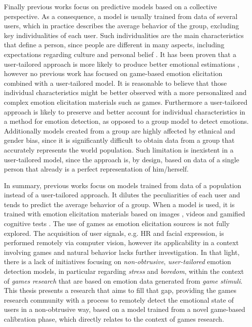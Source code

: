Finally previous works focus on predictive models based on a collective perspective. As a consequence, a model is usually trained from data of several users, which in practice describes the average behavior of the group, excluding key individualities of each user. Such individualities are the main characteristics that define a person, since people are different in many aspects, including expectations regarding culture and personal belief \parencite{goldberg1993structure}. It has been proven that a user-tailored approach is more likely to produce better emotional estimations \parencite{bailenson2008real}, however no previous work has focused on game-based emotion elicitation combined with a user-tailored model. It is reasonable to believe that those individual characteristics might be better observed with a more personalized and complex emotion elicitation materials such as games. Furthermore a user-tailored approach is likely to preserve and better account for individual characteristics in a method for emotion detection, as opposed to a group model to detect emotions. Additionally models created from a group are highly affected by ethnical and gender bias, since it is significantly difficult to obtain data from a group that accurately represents the world population. Such limitation is inexistent in a user-tailored model, since the approach is, by design, based on data of a single person that already is a perfect representation of him/herself.

In summary, previous works focus on models trained from data of a population instead of a user-tailored approach. It dilutes the peculiarities of each user and tends to predict the average behavior of a group. When a model is used, it is trained with emotion elicitation materials based on images \parencite{giannakakis2017stress,anttonen2005emotions}, videos \parencite{bailenson2008real,grundlehner2009design} and gamified cognitive tests \parencite{mcduff2014remote,mcduffcogcam}. The use of games as emotion elicitation sources is not fully explored. The acquisition of user signals, e.g. HR and facial expression, is performed remotely via computer vision, however its applicability in a context involving games and natural behavior lacks further investigation. In that light, there is a lack of initiatives focusing on \textit{non-obtrusive}, \textit{user-tailored} emotion detection models, in particular regarding \textit{stress} and \textit{boredom}, within the context of \textit{games research} that are based on emotion data generated from \textit{game stimuli}. This thesis presents a research that aims to fill that gap, providing the games research community with a process to remotely detect the emotional state of users in a non-obtrusive way, based on a model trained from a novel game-based calibration phase, which directly relates to the context of games research.

